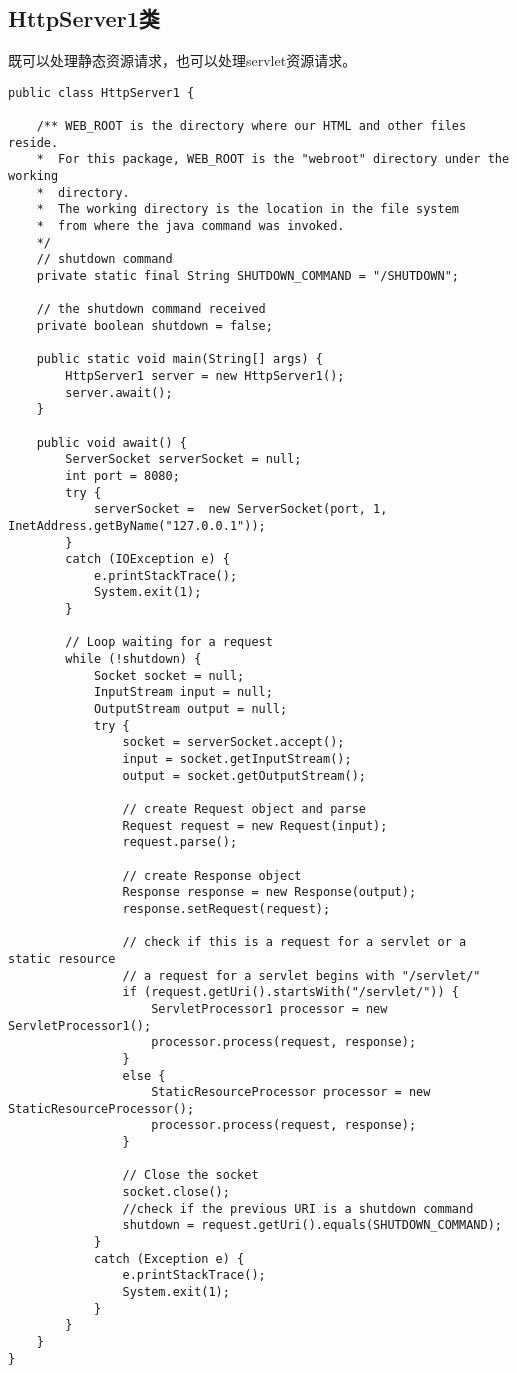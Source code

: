\subsection{HttpServer1类}
既可以处理静态资源请求，也可以处理servlet资源请求。
\begin{lstlisting}
public class HttpServer1 {
	
	/** WEB_ROOT is the directory where our HTML and other files reside.
	*  For this package, WEB_ROOT is the "webroot" directory under the working
	*  directory.
	*  The working directory is the location in the file system
	*  from where the java command was invoked.
	*/
	// shutdown command
	private static final String SHUTDOWN_COMMAND = "/SHUTDOWN";
	
	// the shutdown command received
	private boolean shutdown = false;
	
	public static void main(String[] args) {
		HttpServer1 server = new HttpServer1();
		server.await();
	}
	
	public void await() {
		ServerSocket serverSocket = null;
		int port = 8080;
		try {
			serverSocket =  new ServerSocket(port, 1, InetAddress.getByName("127.0.0.1"));
		}
		catch (IOException e) {
			e.printStackTrace();
			System.exit(1);
		}
		
		// Loop waiting for a request
		while (!shutdown) {
			Socket socket = null;
			InputStream input = null;
			OutputStream output = null;
			try {
				socket = serverSocket.accept();
				input = socket.getInputStream();
				output = socket.getOutputStream();
				
				// create Request object and parse
				Request request = new Request(input);
				request.parse();
				
				// create Response object
				Response response = new Response(output);
				response.setRequest(request);
				
				// check if this is a request for a servlet or a static resource
				// a request for a servlet begins with "/servlet/"
				if (request.getUri().startsWith("/servlet/")) {
					ServletProcessor1 processor = new ServletProcessor1();
					processor.process(request, response);
				}
				else {
					StaticResourceProcessor processor = new StaticResourceProcessor();
					processor.process(request, response);
				}
				
				// Close the socket
				socket.close();
				//check if the previous URI is a shutdown command
				shutdown = request.getUri().equals(SHUTDOWN_COMMAND);
			}
			catch (Exception e) {
				e.printStackTrace();
				System.exit(1);
			}
		}
	}
}
\end{lstlisting}
